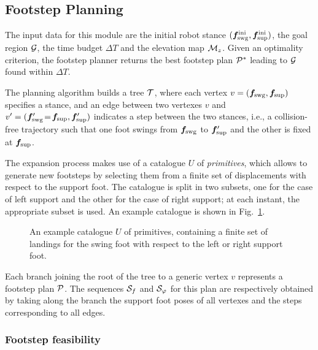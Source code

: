 \subsection{Footstep Planning}
\label{sec:offlineCase:FootstepPlanner}

The input data for this module are the initial robot stance $({\bm{f}}_{\rm swg}^{\rm ini}, {\bm{f}}_{\rm sup}^{\rm ini})$, the goal region $\cal G$, the time budget $\Delta T$ and the elevation map ${\cal M}_z$. Given an optimality criterion, the footstep planner returns the best footstep plan ${\cal P}^*$ leading to $\cal G$ found within $\Delta T$. 

The planning algorithm builds a tree $\cal T$, where each vertex $v = ({\bm{f}}_{\rm swg}, {\bm{f}}_{\rm sup})$ specifies a stance, and an edge between two vertexes $v$ and $v' = ({\bm{f}}'_{\rm swg}\!=\!{\bm{f}}_{\rm sup}, {\bm{f}}'_{\rm sup})$ indicates a step between the two stances, i.e., a collision-free trajectory such that one foot swings from ${\bm{f}}_{\rm swg}$ to ${\bm{f}}'_{\rm sup}$ and the other is fixed at ${\bm{f}}_{\rm sup}$.

The expansion process makes use of a catalogue $U$ of {\em primitives}, which allows to generate new footsteps by selecting them from a finite set of displacements with respect to the support foot. The catalogue is split in two subsets, one for the case of left support  and the other for the case of right support; at each instant, the appropriate subset is used. An example catalogue is shown in Fig.~\ref{fig:Primitives}.

\begin{figure}[t]
\Primitives
\caption{An example catalogue $U$ of primitives, containing a finite set of landings for the swing foot with respect to the left or right support foot.}
\label{fig:Primitives}
\end{figure}

Each branch joining the root of the tree to a generic vertex $v$ represents a footstep plan $\cal P$. The sequences ${\cal S}_f$ and ${\cal S}_\varphi$ for this plan are respectively obtained by taking along the branch the support foot poses of all vertexes and the steps corresponding to all edges.

\medskip

\subsubsection{Footstep feasibility}

